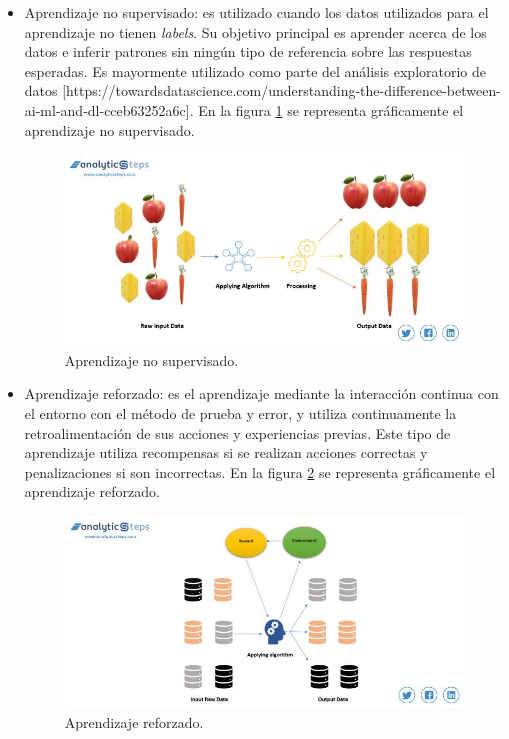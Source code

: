 \begin{itemize}
	\item Aprendizaje no supervisado: es utilizado cuando los datos utilizados para el aprendizaje no tienen \textit{labels}. Su objetivo principal es aprender acerca de los datos e inferir patrones sin ningún tipo de referencia sobre las respuestas esperadas. Es mayormente utilizado como parte del análisis exploratorio de datos [https://towardsdatascience.com/understanding-the-difference-between-ai-ml-and-dl-cceb63252a6c]. En la figura \ref{fig:ml_ul} se representa gráficamente el aprendizaje no supervisado.
	\begin{figure}[h]
		\centering
		\includegraphics[scale=0.4]{./Figures/ml_ul.jpg}
		\caption{Aprendizaje no supervisado.}
		\label{fig:ml_ul}
	\end{figure}
	\item Aprendizaje reforzado: es el aprendizaje mediante la interacción continua con el entorno con el método de prueba y error, y utiliza continuamente la retroalimentación de sus acciones y experiencias previas. Este tipo de aprendizaje utiliza recompensas si se realizan acciones correctas y penalizaciones si son incorrectas. En la figura \ref{fig:ml_rl} se representa gráficamente el aprendizaje reforzado.
	\begin{figure}[h]
		\centering
		\includegraphics[scale=0.4]{./Figures/ml_rl.jpg}
		\caption{Aprendizaje reforzado.}
		\label{fig:ml_rl}
	\end{figure}
\end{itemize}


